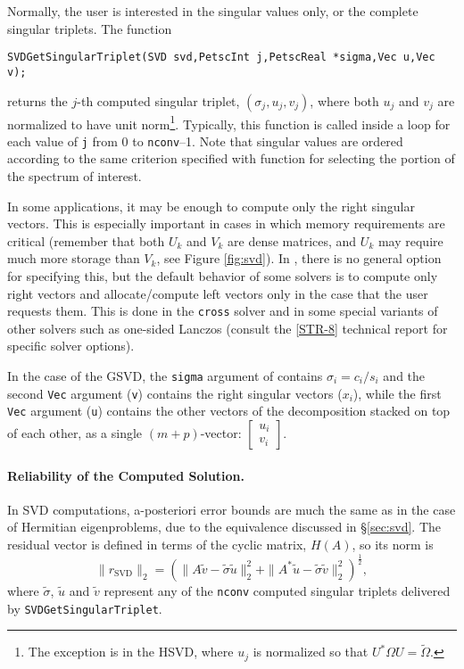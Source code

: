 Normally, the user is interested in the singular values only, or the complete singular triplets. The function
	\begin{Verbatim}[fontsize=\small]
	SVDGetSingularTriplet(SVD svd,PetscInt j,PetscReal *sigma,Vec u,Vec v);
	\end{Verbatim}
returns the $j$-th computed singular triplet, $(\sigma_j,u_j,v_j)$, where both $u_j$ and $v_j$ are normalized to have unit norm\footnote{The exception is in the HSVD, where $u_j$ is normalized so that $U^*\Omega U=\tilde\Omega$.}. Typically, this function is called inside a loop for each value of \texttt{j} from 0 to \texttt{nconv}--1. Note that singular values are ordered according to the same criterion specified with function  for selecting the portion of the spectrum of interest.

In some applications, it may be enough to compute only the right singular vectors. This is especially important in cases in which memory requirements are critical (remember that both $U_k$ and $V_k$ are dense matrices, and $U_k$ may require much more storage than $V_k$, see Figure \ref{fig:svd}). In \slepc, there is no general option for specifying this, but the default behavior of some solvers is to compute only right vectors and allocate/compute left vectors only in the case that the user requests them. This is done in the \texttt{cross} solver and in some special variants of other solvers such as one-sided Lanczos (consult the \hyperlink{str}{[STR-8]} technical report for specific solver options).

In the case of the GSVD, the \texttt{sigma} argument of  contains $\sigma_i=c_i/s_i$ and the second \texttt{Vec} argument (\texttt{v}) contains the right singular vectors ($x_i$), while the first \texttt{Vec} argument (\texttt{u}) contains the other vectors of the decomposition stacked on top of each other, as a single $(m+p)$-vector: $\left[\begin{smallmatrix}u_i\\v_i\end{smallmatrix}\right]$.

\paragraph{Reliability of the Computed Solution.}

In SVD computations, a-posteriori error bounds are much the same as in the case of Hermitian eigenproblems, due to the equivalence discussed in \S\ref{sec:svd}. The residual vector is defined in terms of the cyclic matrix, $H(A)$, so its norm is
\begin{equation}
\|r_\mathrm{SVD}\|_2=\left(\|A\tilde{v}-\tilde{\sigma}\tilde{u}\|_2^2+\|A^*\tilde{u}-\tilde{\sigma}\tilde{v}\|_2^2\right)^{\frac{1}{2}},
\end{equation}
where $\tilde{\sigma}$, $\tilde{u}$ and $\tilde{v}$ represent any of the \texttt{nconv} computed singular triplets delivered by \texttt{SVDGetSingularTriplet}.

